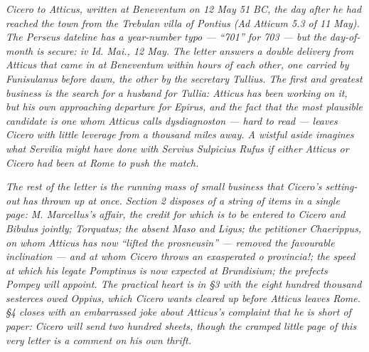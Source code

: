 
\textit{Cicero to Atticus, written at Beneventum on 12 May 51 BC,
the day after he had reached the town from the Trebulan villa
of Pontius (Ad Atticum 5.3 of 11 May). The Perseus dateline has
a year-number typo --- ``701'' for 703 --- but the day-of-month
is secure: iv Id. Mai., 12 May. The letter answers a double
delivery from Atticus that came in at Beneventum within hours of
each other, one carried by Funisulanus before dawn, the other
by the secretary Tullius. The first and greatest business is
the search for a husband for Tullia: Atticus has been working
on it, but his own approaching departure for Epirus, and the
fact that the most plausible candidate is one whom Atticus calls
\textit{dysdiagnoston} --- hard to read --- leaves Cicero with
little leverage from a thousand miles away. A wistful aside
imagines what Servilia might have done with Servius Sulpicius
Rufus if either Atticus or Cicero had been at Rome to push the
match.}

\textit{The rest of the letter is the running mass of small
business that Cicero's setting-out has thrown up at once.
Section 2 disposes of a string of items in a single page: M.
Marcellus's affair, the credit for which is to be entered to
Cicero and Bibulus jointly; Torquatus; the absent Maso and
Ligus; the petitioner Chaerippus, on whom Atticus has now ``lifted
the \textit{prosneusin}'' --- removed the favourable inclination
--- and at whom Cicero throws an exasperated \textit{o
provincia!}; the speed at which his legate Pomptinus is now
expected at Brundisium; the prefects Pompey will appoint. The
practical heart is in \S 3 with the eight hundred thousand
sesterces owed Oppius, which Cicero wants cleared up before
Atticus leaves Rome. \S 4 closes with an embarrassed joke
about Atticus's complaint that he is short of paper: Cicero
will send two hundred sheets, though the cramped little page of
this very letter is a comment on his own thrift.}
